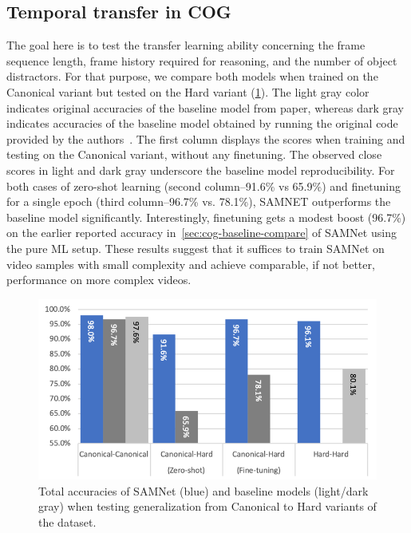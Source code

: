 \subsection{Temporal transfer in COG}
\label{sec:temporal}

The goal here is to test the transfer learning ability concerning the frame sequence length, frame history required
for reasoning, and the number of object distractors.
For that purpose, we compare both models when trained on the Canonical variant but tested on the 
Hard variant (\cref{fig:samnet_cog_overall_transfer}).
The light gray color indicates original accuracies of the baseline model from paper, 
whereas dark gray indicates accuracies of the baseline model
obtained by running the original code provided by the authors~\cite{yang2018implement}.
The first column displays the scores when training and testing on the Canonical variant, without any finetuning. 
The observed close scores in light and dark gray underscore the baseline model reproducibility.
For both cases of zero-shot learning (second column--91.6\% vs 65.9\%) and finetuning for a single epoch 
(third column--96.7\% vs. 78.1\%), SAMNET outperforms the baseline model significantly.
Interestingly, finetuning gets a modest boost (96.7\%) on the earlier reported accuracy in~\cref{sec:cog-baseline-compare}
of SAMNet using the pure ML setup.
These results suggest that it suffices to train SAMNet on video samples with small complexity 
and achieve comparable, if not better, performance on more complex videos.

\begin{figure}[htb]
	\centering
	\includegraphics[width=\columnwidth]{img/results/samnet_cog_overall_transfer.png}
	\caption{Total accuracies of SAMNet (blue) and baseline models (light/dark gray) when testing generalization from Canonical to Hard variants of the dataset.}
	\label{fig:samnet_cog_overall_transfer}
\end{figure}


